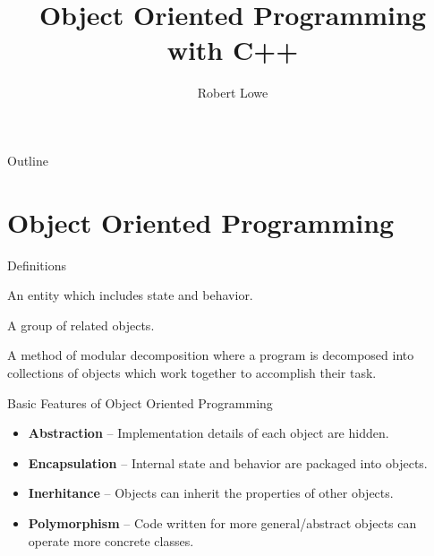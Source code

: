 \documentclass[handout]{beamer}
\title{Object Oriented Programming with C++}
\author{Robert Lowe}
\institute[Southeast Missouri State University] %
{
  Department of Computer Science\\
  Southeast Missouri State University
}
\date[]{}
\begin{document}
\begin{frame}
  \titlepage
\end{frame}

\begin{frame}{Outline}
  \tableofcontents
\end{frame}





\section{Object Oriented Programming}
\begin{frame}{Definitions}
    \begin{description}[<+->]
    \item[Object] An entity which includes state and behavior.
    \item[Class] A group of related objects.
    \item[Object Oriented Programming] A method of modular
        decomposition where a program is decomposed into collections
        of objects which work together to accomplish their task.
    \end{description}
\end{frame}



\begin{frame}{Basic Features of Object Oriented Programming}
    \begin{itemize}[<+->]
        \item {\bf Abstraction} -- Implementation details of each object are hidden.
        \item {\bf Encapsulation} -- Internal state and behavior are packaged into objects.
        \item {\bf Inerhitance} -- Objects can inherit the properties of other objects.
        \item {\bf Polymorphism} -- Code written for more general/abstract objects can operate more concrete classes.
    \end{itemize}
\end{frame}
\end{document}
